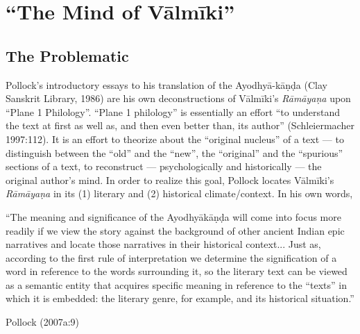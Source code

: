 \chapter{“The Mind of Vālmīki”}\label{chapter1}


\section{The Problematic}\label{sec1.1}

Pollock's introductory essays to his translation of the Ayodhyā-kāṇḍa (Clay Sanskrit Library, 1986) are his own deconstructions of Vālmīki’s {\sl Rāmāyaṇa} upon “Plane 1 Philology”. “Plane 1 philology” is essentially an effort “to understand the text at first as well as, and then even better than, its author” (Schleiermacher 1997:112). It is an effort to theorize about the “original nucleus” of a text --- to distinguish between the “old” and the “new”, the “original” and the “spurious” sections of a text, to reconstruct --- psychologically and historically --- the original author's mind. In order to realize this goal, Pollock locates Vālmīki’s {\sl Rāmāyaṇa} in its (1) literary and (2) historical climate/context. In his own words,  

\medskip
\begin{myquote}
“The meaning and significance of the Ayodhyākāṇḍa will come into focus more readily if we view the story against the background of other ancient Indian epic narratives and locate those narratives in their historical context... Just as, according to the first rule of interpretation we determine the signification of a word in reference to the words surrounding it, so the literary text can be viewed as a semantic entity that acquires specific meaning in reference to the “texts” in which it is embedded: the literary genre, for example, and its historical situation.” 		
	       							         				      
\hfill  Pollock (2007a:9)
\end{myquote}


